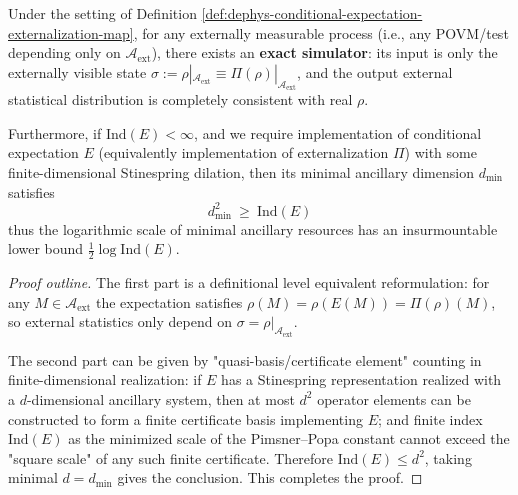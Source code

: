 \begin{proposition}\label{prop:dephys-operator-zk-simulation-index-lower-bound}
Under the setting of Definition \ref{def:dephys-conditional-expectation-externalization-map},
for any externally measurable process (i.e., any POVM/test depending only on \(\mathcal{A}_{\mathrm{ext}}\)), there exists an \textbf{exact simulator}: its input is only the externally visible state
\(
\sigma:=\rho|_{\mathcal{A}_{\mathrm{ext}}}\equiv \Pi(\rho)|_{\mathcal{A}_{\mathrm{ext}}}
\),
and the output external statistical distribution is completely consistent with real \(\rho\).
\par
Furthermore, if \(\mathrm{Ind}(E)<\infty\), and we require implementation of conditional expectation \(E\) (equivalently implementation of externalization \(\Pi\)) with some finite-dimensional Stinespring dilation,
then its minimal ancillary dimension \(d_{\min}\) satisfies
\[
\boxed{\;d_{\min}^2\ \ge\ \mathrm{Ind}(E)\;}
\]
thus the logarithmic scale of minimal ancillary resources has an insurmountable lower bound \(\tfrac12\log\mathrm{Ind}(E)\).
\end{proposition}
\begin{proof}[Proof outline]
The first part is a definitional level equivalent reformulation: for any \(M\in\mathcal{A}_{\mathrm{ext}}\) the expectation satisfies
\(
\rho(M)=\rho(E(M))=\Pi(\rho)(M)
\), so external statistics only depend on \(\sigma=\rho|_{\mathcal{A}_{\mathrm{ext}}}\).
\par
The second part can be given by "quasi-basis/certificate element" counting in finite-dimensional realization: if \(E\) has a Stinespring representation realized with a \(d\)-dimensional ancillary system, then at most \(d^2\) operator elements can be constructed to form a finite certificate basis implementing \(E\);
and finite index \(\mathrm{Ind}(E)\) as the minimized scale of the Pimsner--Popa constant cannot exceed the "square scale" of any such finite certificate.
Therefore \(\mathrm{Ind}(E)\le d^2\), taking minimal \(d=d_{\min}\) gives the conclusion. This completes the proof.
\end{proof}



